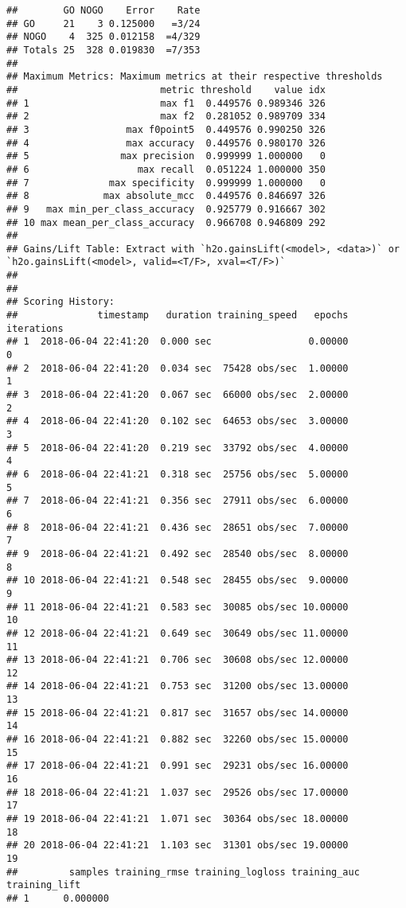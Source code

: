 \documentclass[]{article}
\begin{document}
\begin{verbatim}
##        GO NOGO    Error    Rate
## GO     21    3 0.125000   =3/24
## NOGO    4  325 0.012158  =4/329
## Totals 25  328 0.019830  =7/353
## 
## Maximum Metrics: Maximum metrics at their respective thresholds
##                         metric threshold    value idx
## 1                       max f1  0.449576 0.989346 326
## 2                       max f2  0.281052 0.989709 334
## 3                 max f0point5  0.449576 0.990250 326
## 4                 max accuracy  0.449576 0.980170 326
## 5                max precision  0.999999 1.000000   0
## 6                   max recall  0.051224 1.000000 350
## 7              max specificity  0.999999 1.000000   0
## 8             max absolute_mcc  0.449576 0.846697 326
## 9   max min_per_class_accuracy  0.925779 0.916667 302
## 10 max mean_per_class_accuracy  0.966708 0.946809 292
## 
## Gains/Lift Table: Extract with `h2o.gainsLift(<model>, <data>)` or `h2o.gainsLift(<model>, valid=<T/F>, xval=<T/F>)`
## 
## 
## Scoring History: 
##              timestamp   duration training_speed   epochs iterations
## 1  2018-06-04 22:41:20  0.000 sec                 0.00000          0
## 2  2018-06-04 22:41:20  0.034 sec  75428 obs/sec  1.00000          1
## 3  2018-06-04 22:41:20  0.067 sec  66000 obs/sec  2.00000          2
## 4  2018-06-04 22:41:20  0.102 sec  64653 obs/sec  3.00000          3
## 5  2018-06-04 22:41:20  0.219 sec  33792 obs/sec  4.00000          4
## 6  2018-06-04 22:41:21  0.318 sec  25756 obs/sec  5.00000          5
## 7  2018-06-04 22:41:21  0.356 sec  27911 obs/sec  6.00000          6
## 8  2018-06-04 22:41:21  0.436 sec  28651 obs/sec  7.00000          7
## 9  2018-06-04 22:41:21  0.492 sec  28540 obs/sec  8.00000          8
## 10 2018-06-04 22:41:21  0.548 sec  28455 obs/sec  9.00000          9
## 11 2018-06-04 22:41:21  0.583 sec  30085 obs/sec 10.00000         10
## 12 2018-06-04 22:41:21  0.649 sec  30649 obs/sec 11.00000         11
## 13 2018-06-04 22:41:21  0.706 sec  30608 obs/sec 12.00000         12
## 14 2018-06-04 22:41:21  0.753 sec  31200 obs/sec 13.00000         13
## 15 2018-06-04 22:41:21  0.817 sec  31657 obs/sec 14.00000         14
## 16 2018-06-04 22:41:21  0.882 sec  32260 obs/sec 15.00000         15
## 17 2018-06-04 22:41:21  0.991 sec  29231 obs/sec 16.00000         16
## 18 2018-06-04 22:41:21  1.037 sec  29526 obs/sec 17.00000         17
## 19 2018-06-04 22:41:21  1.071 sec  30364 obs/sec 18.00000         18
## 20 2018-06-04 22:41:21  1.103 sec  31301 obs/sec 19.00000         19
##         samples training_rmse training_logloss training_auc training_lift
## 1      0.000000                                                          

\end{verbatim}
\end{document}
